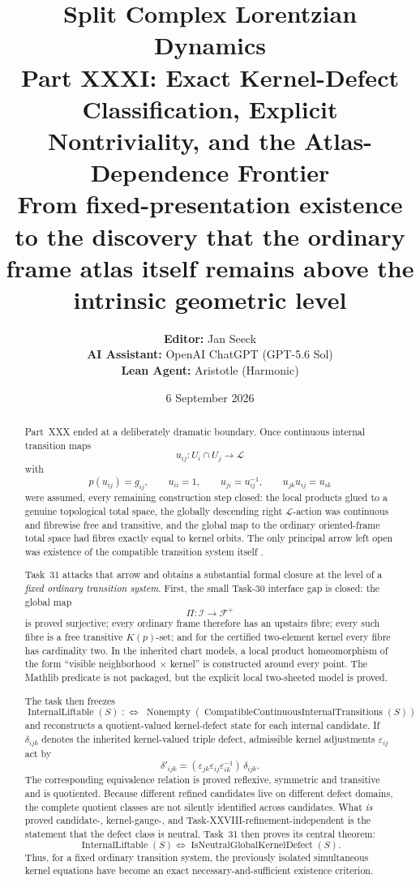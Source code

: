 \documentclass[11pt,a4paper]{article}
\title{\textbf{Split Complex Lorentzian Dynamics}\\[0.45em]
\large Part XXXI: Exact Kernel-Defect Classification, Explicit Nontriviality, and the Atlas-Dependence Frontier\\[0.35em]
\normalsize From fixed-presentation existence to the discovery that the ordinary frame atlas itself remains above the intrinsic geometric level}
\author{%
\textbf{Editor:} Jan Seeck\\
\textbf{AI Assistant:} OpenAI ChatGPT (GPT-5.6 Sol)\\
\textbf{Lean Agent:} Aristotle (Harmonic)}
\date{6 September 2026}
\theoremstyle{definition}
\newcommand{\Lift}{\mathcal{L}}
\newcommand{\Ker}{K}
\newcommand{\proj}{p}
\newcommand{\ITot}{\mathcal{I}}
\newcommand{\FTot}{\mathcal{F}^{+}}
\newcommand{\code}[1]{\path{#1}}
\begin{document}
\maketitle

\begin{abstract}
Part~XXX ended at a deliberately dramatic boundary.  Once continuous internal transition maps
\[
 u_{ij}:U_i\cap U_j\longrightarrow\Lift
\]
with
\[
 \proj(u_{ij})=g_{ij},\qquad u_{ii}=1,\qquad u_{ji}=u_{ij}^{-1},\qquad u_{jk}u_{ij}=u_{ik}
\]
were assumed, every remaining construction step closed: the local products glued to a genuine topological total space, the globally descending right $\Lift$-action was continuous and fibrewise free and transitive, and the global map to the ordinary oriented-frame total space had fibres exactly equal to kernel orbits.  The only principal arrow left open was existence of the compatible transition system itself \cite{Experiment2PartXXX2026,AristotleTask30_2026}.

Task~31 attacks that arrow and obtains a substantial formal closure at the level of a \emph{fixed ordinary transition system}.  First, the small Task-30 interface gap is closed: the global map
\[
 \Pi:\ITot\longrightarrow\FTot
\]
is proved surjective; every ordinary frame therefore has an upstairs fibre; every such fibre is a free transitive $\Ker(\proj)$-set; and for the certified two-element kernel every fibre has cardinality two.  In the inherited chart models, a local product homeomorphism of the form ``visible neighborhood $\times$ kernel'' is constructed around every point.  The Mathlib predicate \code{IsCoveringMap} is not packaged, but the explicit local two-sheeted model is proved.

The task then freezes
\[
 \operatorname{InternalLiftable}(S)
 \;:\Longleftrightarrow\;
 \operatorname{Nonempty}(\operatorname{CompatibleContinuousInternalTransitions}(S))
\]
and reconstructs a quotient-valued kernel-defect state for each internal candidate.  If $\delta_{ijk}$ denotes the inherited kernel-valued triple defect, admissible kernel adjustments $\varepsilon_{ij}$ act by
\[
 \delta'_{ijk}
 = (\varepsilon_{jk}\varepsilon_{ij}\varepsilon_{ik}^{-1})\,\delta_{ijk}.
\]
The corresponding equivalence relation is proved reflexive, symmetric and transitive and is quotiented.  Because different refined candidates live on different defect domains, the complete quotient classes are not silently identified across candidates.  What \emph{is} proved candidate-, kernel-gauge-, and Task-XXVIII-refinement-independent is the statement that the defect class is neutral.  Task~31 then proves its central theorem:
\[
 \boxed{
 \operatorname{InternalLiftable}(S)
 \iff
 \operatorname{IsNeutralGlobalKernelDefect}(S).}
\]
Thus, for a fixed ordinary transition system, the previously isolated simultaneous kernel equations have become an exact necessary-and-sufficient existence criterion.


\end{abstract}
\end{document}
